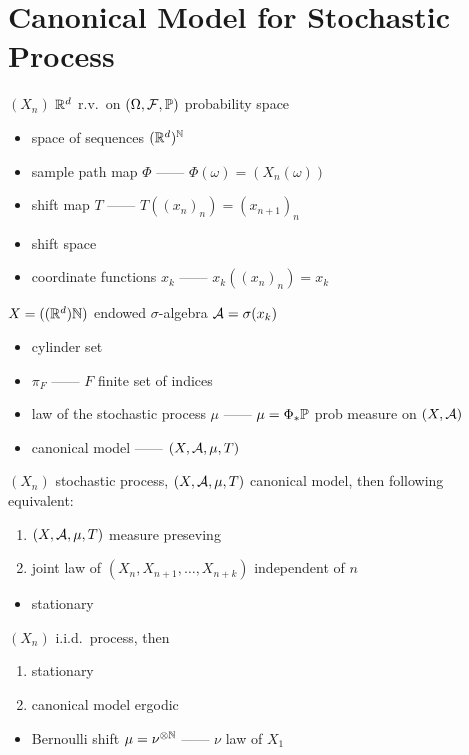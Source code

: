 \section{Canonical Model for Stochastic Process}\label{sec:canonical-model-for-stochastic-process}

\begin{setting}
    $(X_n)$ $\mathbb{R}^d$ r.v.\ on $(\Omega, \mathcal{F}, \mathbb{P})$ probability space
\end{setting}

\begin{itemize}
    \item space of sequences $(\mathbb{R}^d)^{\mathbb{N}}$
    \item sample path map $\Phi$ ------ $\Phi(\omega) = (X_n(\omega))$
    \item shift map $T$ ------ $T((x_n)_n) = (x_{n+1})_n$
    \item shift space
    \item coordinate functions $x_k$ ------ $x_k((x_n)_n) = x_k$
\end{itemize}

\begin{setting}
    $X = ((\mathbb{R}^d)\mathbb{N})$ endowed $\sigma$-algebra $\mathcal{A} = \sigma(x_k)$
\end{setting}

\begin{itemize}
    \item cylinder set
    \item $\pi_F$ ------ $F$ finite set of indices
    \item law of the stochastic process $\mu$ ------ $\mu = \Phi_\ast\mathbb{P}$ prob measure on $(X, \mathcal{A})$
    \item canonical model ------ $(X, \mathcal{A}, \mu, T)$
\end{itemize}

\begin{prop}
    $(X_n)$ stochastic process, $(X, \mathcal{A}, \mu, T)$ canonical model, then following equivalent:
    \begin{enumerate}
        \item $(X, \mathcal{A} ,\mu, T)$ measure preseving
        \item joint law of $(X_n, X_{n+1}, \dots, X_{n+k})$ independent of $n$
    \end{enumerate}
\end{prop}

\begin{itemize}
    \item stationary
\end{itemize}

\begin{prop}
    $(X_n)$ i.i.d.\ process, then
    \begin{enumerate}
        \item stationary
        \item canonical model ergodic
    \end{enumerate}
\end{prop}

\begin{itemize}
    \item Bernoulli shift $\mu = \nu^{\otimes \mathbb{N}}$ ------ $\nu$ law of $X_1$
\end{itemize}



